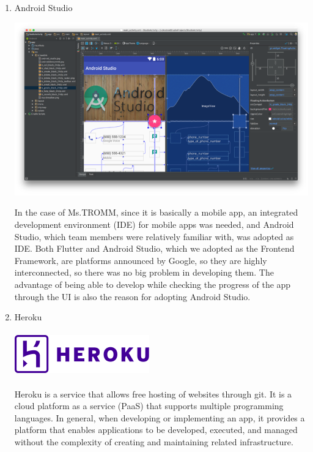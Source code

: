 \documentclass[conference]{IEEEtran}
\begin{document}
\begin{enumerate}
    
    \item Android Studio \\ 
    \centerline{\includegraphics[scale=0.9]{assets/as.png}}
    In the case of Ms.TROMM, since it is basically a mobile app, an integrated development environment (IDE) for mobile apps was needed, and Android Studio, which team members were relatively familiar with, was adopted as IDE. Both Flutter and Android Studio, which we adopted as the Frontend Framework, are platforms announced by Google, so they are highly interconnected, so there was no big problem in developing them. The advantage of being able to develop while checking the progress of the app through the UI is also the reason for adopting Android Studio. 

    \break
    
    \item Heroku\\\\
    \includegraphics{assets/Heroku.png}
    \\ \\ Heroku is a service that allows free hosting of websites through git. It is a cloud platform as a service (PaaS) that supports multiple programming languages. In general, when developing or implementing an app, it provides a platform that enables applications to be developed, executed, and managed without the complexity of creating and maintaining related infrastructure. \\ \\ \\ \\ \\ \\ \\ \\ \\ \\ \\ \\ \\ \\ \\
    

\end{enumerate}
\end{document}
